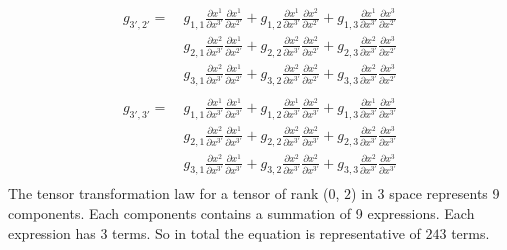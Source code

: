 \documentclass[9pt]{report}
\begin{document}
  \[
    \begin{align*}
    g_{3', 2'} =
     &\ g_{1,1}\frac{\partial x^1}{\partial x^{3'}}\frac{\partial x^1}{\partial x^{2'}}
    +g_{1,2}\frac{\partial x^1}{\partial x^{3'}}\frac{\partial x^2}{\partial x^{2'}}
    +g_{1,3}\frac{\partial x^1}{\partial x^{3'}}\frac{\partial x^3}{\partial x^{2'}}\\
    &\
     g_{2,1}\frac{\partial x^2}{\partial x^{3'}}\frac{\partial x^1}{\partial x^{2'}}
    +g_{2,2}\frac{\partial x^2}{\partial x^{3'}}\frac{\partial x^2}{\partial x^{2'}}
    +g_{2,3}\frac{\partial x^2}{\partial x^{3'}}\frac{\partial x^3}{\partial x^{2'}}\\
    &\
     g_{3,1}\frac{\partial x^2}{\partial x^{3'}}\frac{\partial x^1}{\partial x^{2'}}
    +g_{3,2}\frac{\partial x^2}{\partial x^{3'}}\frac{\partial x^2}{\partial x^{2'}}
    +g_{3,3}\frac{\partial x^2}{\partial x^{3'}}\frac{\partial x^3}{\partial x^{2'}}\\
    \end{align*}
  \]
  \[
    \begin{align*}
    g_{3', 3'} =
     &\ g_{1,1}\frac{\partial x^1}{\partial x^{3'}}\frac{\partial x^1}{\partial x^{3'}}
    +g_{1,2}\frac{\partial x^1}{\partial x^{3'}}\frac{\partial x^2}{\partial x^{3'}}
    +g_{1,3}\frac{\partial x^1}{\partial x^{3'}}\frac{\partial x^3}{\partial x^{3'}}\\
    &\
     g_{2,1}\frac{\partial x^2}{\partial x^{3'}}\frac{\partial x^1}{\partial x^{3'}}
    +g_{2,2}\frac{\partial x^2}{\partial x^{3'}}\frac{\partial x^2}{\partial x^{3'}}
    +g_{2,3}\frac{\partial x^2}{\partial x^{3'}}\frac{\partial x^3}{\partial x^{3'}}\\
    &\
     g_{3,1}\frac{\partial x^2}{\partial x^{3'}}\frac{\partial x^1}{\partial x^{3'}}
    +g_{3,2}\frac{\partial x^2}{\partial x^{3'}}\frac{\partial x^2}{\partial x^{3'}}
    +g_{3,3}\frac{\partial x^2}{\partial x^{3'}}\frac{\partial x^3}{\partial x^{3'}}\\
    \end{align*}
  \]
The tensor transformation law for a tensor of rank ($0$, $2$) in 3 space
represents 9 components. Each components contains a summation of 9 expressions.
Each expression has 3 terms. So in total the equation is representative of
$243$ terms.
\end{document}
